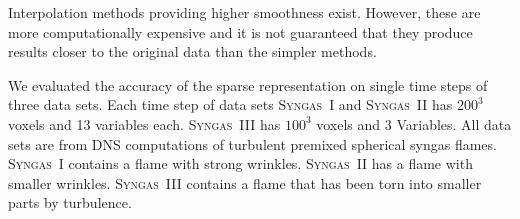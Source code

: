 %
Interpolation methods providing higher smoothness exist.
%
However, these are more computationally expensive and it is not guaranteed that
they produce results closer to the original data than the simpler methods.
%

%
We evaluated the accuracy of the sparse representation on single time steps of
three data sets.
%
Each time step of data sets \textsc{Syngas~I} and \textsc{Syngas~II} has $200^3$
voxels and 13 variables each. \textsc{Syngas~III} has $100^3$ voxels and 3
Variables.
%
All data sets are from \ac{DNS} computations of turbulent premixed spherical
syngas flames.
%
\textsc{Syngas~I} contains a flame with strong wrinkles.
%
\textsc{Syngas~II} has a flame with smaller wrinkles.
%
\textsc{Syngas~III} contains a flame that has been torn into smaller parts by
turbulence.
%
%
%


